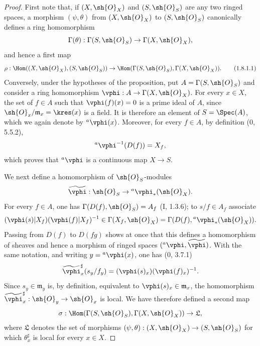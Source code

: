 \begin{proof}
First note that, if $(X,\sh{O}_X)$ and $(S,\sh{O}_S)$ are any two
ringed spaces, a morphism $(\psi,\theta)$ from $(X,\sh{O}_X)$ to
$(S,\sh{O}_S)$ canonically defines a ring homomorphism
\[
  \Gamma(\theta):\Gamma(S,\sh{O}_S)\to\Gamma(X,\sh{O}_X),
\]
and hence a first map
\begin{equation}
\label{I.1.8.1.1}
  \rho:\Hom((X,\sh{O}_X),(S,\sh{O}_S))
  \to\Hom(\Gamma(S,\sh{O}_S),\Gamma(X,\sh{O}_X)).
\tag{1.8.1.1}
\end{equation}
Conversely, under the hypotheses of the proposition, put
$A=\Gamma(S,\sh{O}_S)$ and consider a ring homomorphism
$\vphi:A\to\Gamma(X,\sh{O}_X)$.  For every $x\in X$, the set of
$f\in A$ such that $\vphi(f)(x)=0$ is a prime ideal of $A$, since
$\sh{O}_x/\mathfrak{m}_x=\kres(x)$ is a field.  It is therefore an
element of $S=\Spec(A)$, which we again denote by ${}^a\vphi(x)$.
Moreover, for every $f\in A$, by definition (0, 5.5.2),
\[
  {}^a\vphi^{-1}(D(f))=X_f,
\]
which proves that ${}^a\vphi$ is a continuous map $X\to S$.

We next define a homomorphism of $\sh{O}_S$-modules
\[
  \widetilde{\vphi}:\sh{O}_S\to{}^a\vphi_*(\sh{O}_X).
\]
For every $f\in A$, one has
$\Gamma(D(f),\sh{O}_S)=A_f$ (I, 1.3.6); to $s/f\in A_f$ associate
\[
  (\vphi(s)|X_f)(\vphi(f)|X_f)^{-1}
  \in\Gamma(X_f,\sh{O}_X)
  =\Gamma(D(f),{}^a\vphi_*(\sh{O}_X)).
\]
Passing from $D(f)$ to $D(fg)$ shows at once that this defines a
homomorphism of sheaves and hence a morphism of ringed spaces
$({}^a\vphi,\widetilde{\vphi})$.  With the same notation, and writing
$y={}^a\vphi(x)$, one has (0, 3.7.1)
\[
  \widetilde{\vphi}_x^\sharp(s_y/f_y)
  =(\vphi(s)_x)(\vphi(f)_x)^{-1}.
\]
Since $s_y\in\mathfrak{m}_y$ is, by definition, equivalent to
$\vphi(s)_x\in\mathfrak{m}_x$, the homomorphism
$\widetilde{\vphi}_x^\sharp:\sh{O}_y\to\sh{O}_x$ is local.  We have
therefore defined a second map
\[
  \sigma:\Hom(\Gamma(S,\sh{O}_S),\Gamma(X,\sh{O}_X))
  \to\mathfrak{L},
\]
where $\mathfrak{L}$ denotes the set of morphisms
$(\psi,\theta):(X,\sh{O}_X)\to(S,\sh{O}_S)$ for which
$\theta_x^\sharp$ is local for every $x\in X$.


\end{proof}
